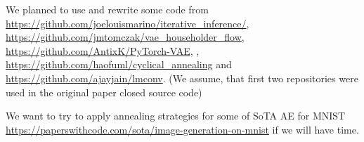 \documentclass[a4paper]{article}
\begin{document}
We planned to use and rewrite some code from \url{https://github.com/joelouismarino/iterative_inference/}, \url{https://github.com/jmtomczak/vae_householder_flow}, \url{https://github.com/AntixK/PyTorch-VAE}, , \url{https://github.com/haofuml/cyclical_annealing} and \url{https://github.com/ajayjain/lmconv}. (We assume, that first two repositories were used in the original paper \cite{main_Huang2018ImprovingEI} closed source code) 

We want to try to apply annealing strategies for some of SoTA AE for MNIST \url{https://paperswithcode.com/sota/image-generation-on-mnist} if we will have time.



\end{document}
